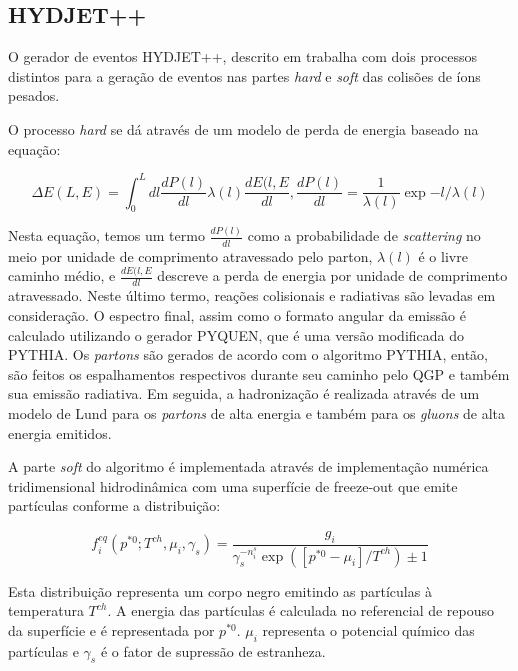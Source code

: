 \subsection{HYDJET++}

O gerador de eventos HYDJET++, descrito em \cite{lokhtin_hydjet++_2009} trabalha com dois
processos distintos para a geração de eventos nas partes {\it hard} e {\it soft} das
colisões de íons pesados.
\par
O processo {\it hard} se dá através de um modelo de perda de energia baseado na equação:

\begin{equation}
 \Delta E (L, E) = \int_{0}^{L} dl \frac{dP(l)}{dl} \lambda (l) \frac{dE(l,E}{dl},
 \frac{dP(l)}{dl} = \frac{1}{\lambda (l)} \exp{-l/\lambda (l)}
\end{equation}

Nesta equação, temos um termo $\frac{dP(l)}{dl}$ como a probabilidade de \emph{scattering} no meio
por unidade de comprimento atravessado pelo parton, $\lambda (l)$ é o livre caminho médio, e
$\frac{dE(l,E}{dl}$ descreve a perda de energia por unidade de comprimento atravessado. Neste último
termo, reações colisionais e radiativas são levadas em consideração. O espectro final, assim como o
formato angular da emissão é calculado utilizando o gerador PYQUEN\cite{noauthor_pyquen_nodate}, que é uma versão modificada
do PYTHIA\cite{noauthor_pythia_nodate}. Os \emph{partons} são gerados de acordo com o algoritmo PYTHIA, então, são
feitos os espalhamentos respectivos durante seu caminho pelo QGP e também sua emissão radiativa. Em seguida,
a hadronização é realizada através de um modelo de Lund\cite{skands_introduction_2013} para os \emph{partons} de alta energia e
também para os \emph{gluons} de alta energia emitidos.

\par

A parte \emph{soft} do algoritmo é implementada através de implementação numérica tridimensional hidrodinâmica
com uma superfície de freeze-out que emite partículas conforme a distribuição:

\begin{equation}
 f_{i}^{eq} (p^{*0} ;T^{ch} ,\mu_i , \gamma_s) = \frac{ g_i }{ \gamma_s^{-n_{i}^{s}} \exp{ ( [p^{*0} - \mu_i]/T^{ch} ) } \pm 1 }
\end{equation}

Esta distribuição representa um corpo negro emitindo as partículas à temperatura $T^{ch}$. A energia das partículas é calculada
no referencial de repouso da superfície e é representada por $p^{*0}$. $\mu_i$ representa o potencial químico das partículas e
$\gamma_s$ é o fator de supressão de estranheza.